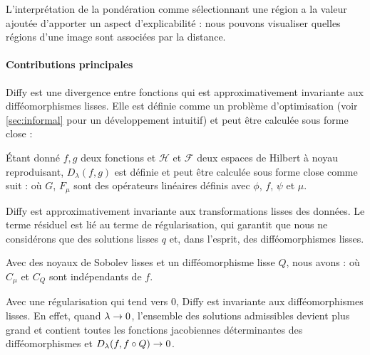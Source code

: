 L'interprétation de la pondération comme sélectionnant une région a la valeur ajoutée d'apporter un aspect d'explicabilité : nous pouvons visualiser quelles régions d'une image sont associées par la distance.

\paragraph{Contributions principales}
Diffy est une divergence entre fonctions qui est approximativement invariante aux difféomorphismes lisses.
Elle est définie comme un problème d'optimisation (voir \cref{sec:informal} pour un développement intuitif) et peut être calculée sous forme close :
\begin{mdframed}
\begin{informaltheorem}
Étant donné $f, g$ deux fonctions et $\mathcal H$ et $\mathcal F$ deux espaces de Hilbert à noyau reproduisant, $D_\lambda(f, g)$ est définie et peut être calculée sous forme close comme suit :
où $G$, $F_\mu$ sont des opérateurs linéaires définis avec $\phi$, $f$, $\psi$ et $\mu$.
\end{informaltheorem}
\end{mdframed}

Diffy est approximativement invariante aux transformations lisses des données. Le terme résiduel est lié au terme de régularisation, qui garantit que nous ne considérons que des solutions lisses $q$ et, dans l'esprit, des difféomorphismes lisses.
\begin{mdframed}
\begin{informaltheorem}
Avec des noyaux de Sobolev lisses et un difféomorphisme lisse $Q$, nous avons :
où $C_\mu$ et $C_Q$ sont indépendants de $f$.
\end{informaltheorem}
\end{mdframed}
\noindent Avec une régularisation qui tend vers $0$, Diffy est invariante aux difféomorphismes lisses. En effet, quand $\lambda \to 0$, l'ensemble des solutions admissibles devient plus grand et contient toutes les fonctions jacobiennes déterminantes des difféomorphismes et $D_\lambda(f, f\circ Q)\to 0$.

